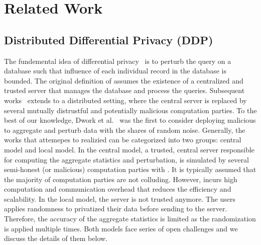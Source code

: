 \chapter{Related Work}
\label{cha:RelatedWork}

\section{Distributed Differential Privacy (DDP)}
\label{sec:DistributedDifferentialPrivacy}

The fundemental idea of differential privacy~\cite{dwork2006differential} is to perturb the query on a database such that influence of each individual record in the database is bounded. The original definition of \differentialprivacy assumes the existence of a centralized and trusted server that manages the database and process the queries. Subsequent works~\cite{dwork2006our} extends \differentialprivacy to a distributed setting, where the central server is replaced by several mutually distrustful and potentially malicious computation parties. To the best of our knowledge, Dwork et al.~\cite{dwork2006our} was the first to consider deploying malicious \smpc to aggregate and perturb data with the shares of random noise. Generally, the works that attemepes to realizied \ddp can be categorized into two groups: central \differentialprivacy model and local \differentialprivacy model. In the central \differentialprivacy model, a trusted, central server responsible for computing the aggregate statistics and perturbation, is simulated by several semi-honest (or malicious) computation parties with \smpc. It is typically assumed that the majority of computation parties are not colluding. However, \smpc incurs high computation and communication overhead that reduces the efficiency and scalability. In the local \differentialprivacy model, the server is not trusted anymore. The users applies randomness to privatized their data before sending to the server. Therefore, the accuracy of the aggregate statistics is limited as the randomization is applied multiple times. Both models face series of open challenges and we discuss the details of them below.

